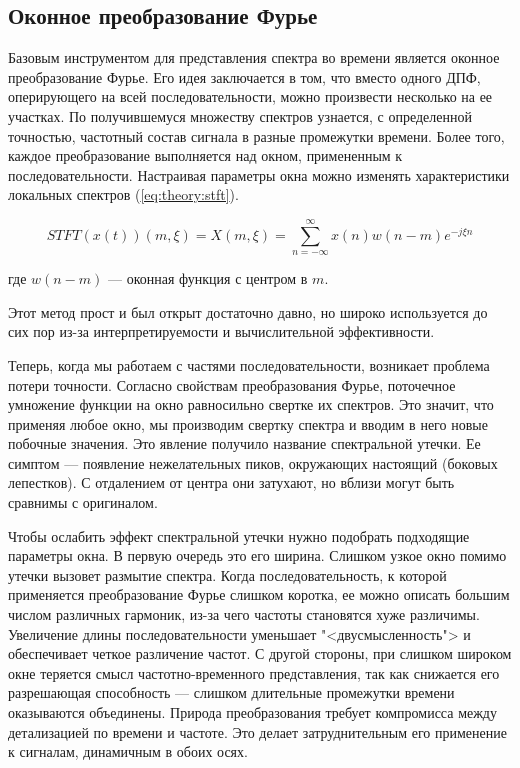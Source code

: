\subsection{Оконное преобразование Фурье}

Базовым инструментом для представления спектра во времени является оконное преобразование Фурье. Его идея заключается в том, что вместо одного ДПФ, оперирующего на всей последовательности, можно произвести несколько на ее участках. По получившемуся множеству спектров узнается, с определенной точностью, частотный состав сигнала в разные промежутки времени. Более того, каждое преобразование выполняется над окном, примененным к последовательности. Настраивая параметры окна можно изменять характеристики локальных спектров (\autoref{eq:theory:stft}).

\begin{equation}
  \label{eq:theory:stft}
  \mathit{STFT}(x(t))(m, \xi) = X(m, \xi) = \sum_{n=-\infty}^\infty x(n) w(n - m) e^{-j \xi n}
\end{equation}
\begin{explanation}
\item[где] $w(n - m)$ --- оконная функция с центром в $m$.
\end{explanation}

Этот метод прост и был открыт достаточно давно, но широко используется до сих пор из-за интерпретируемости и вычислительной эффективности.

Теперь, когда мы работаем с частями последовательности, возникает проблема потери точности. Согласно свойствам преобразования Фурье, поточечное умножение функции на окно равносильно свертке их спектров. Это значит, что применяя любое окно, мы производим свертку спектра и вводим в него новые побочные значения. Это явление получило название спектральной утечки. Ее симптом --- появление нежелательных пиков, окружающих настоящий (боковых лепестков). С отдалением от центра они затухают, но вблизи могут быть сравнимы с оригиналом.

Чтобы ослабить эффект спектральной утечки нужно подобрать подходящие параметры окна. В первую очередь это его ширина. Слишком узкое окно помимо утечки вызовет размытие спектра. Когда последовательность, к которой применяется преобразование Фурье слишком коротка, ее можно описать большим числом различных гармоник, из-за чего частоты становятся хуже различимы. Увеличение длины последовательности уменьшает "<двусмысленность"> и обеспечивает четкое различение частот. С другой стороны, при слишком широком окне теряется смысл частотно-временного представления, так как снижается его разрешающая способность --- слишком длительные промежутки времени оказываются объединены. Природа преобразования требует компромисса между детализацией по времени и частоте. Это делает затруднительным его применение к сигналам, динамичным в обоих осях.

